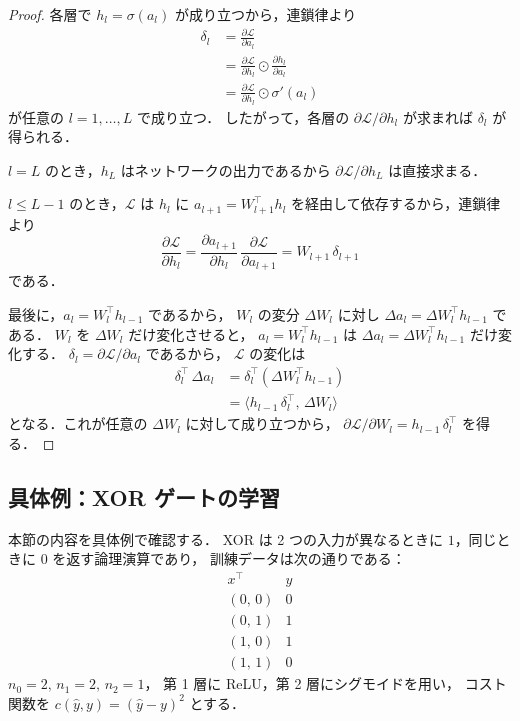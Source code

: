 \documentclass[uplatex, dvipdfmx]{jsarticle}
\begin{document}
\begin{proof}
各層で $h_l = \sigma(a_l)$ が成り立つから，連鎖律より
\begin{align*}
\delta_l
&= \frac{\partial\mathcal{L}}{\partial a_l} \\
&= \frac{\partial\mathcal{L}}{\partial h_l}\odot\frac{\partial h_l}{\partial a_l} \\
&= \frac{\partial\mathcal{L}}{\partial h_l}\odot\sigma'(a_l)
\end{align*}
が任意の $l=1,\ldots,L$ で成り立つ．
したがって，各層の $\partial\mathcal{L}/\partial h_l$ が求まれば $\delta_l$ が得られる．

$l=L$ のとき，$h_L$ はネットワークの出力であるから
$\partial\mathcal{L}/\partial h_L$ は直接求まる．

$l\le L{-}1$ のとき，$\mathcal{L}$ は $h_l$ に
$a_{l+1}=W_{l+1}^\top h_l$ を経由して依存するから，連鎖律より
\[
\frac{\partial\mathcal{L}}{\partial h_l}
= \frac{\partial a_{l+1}}{\partial h_l}\,\frac{\partial\mathcal{L}}{\partial a_{l+1}}
= W_{l+1}\,\delta_{l+1}
\]
である．

最後に，$a_l = W_l^\top h_{l-1}$ であるから，
$W_l$ の変分 $\Delta W_l$ に対し $\Delta a_l = \Delta W_l^\top h_{l-1}$ である．
$W_l$ を $\Delta W_l$ だけ変化させると，
$a_l = W_l^\top h_{l-1}$ は $\Delta a_l = \Delta W_l^\top h_{l-1}$ だけ変化する．
$\delta_l = \partial\mathcal{L}/\partial a_l$ であるから，
$\mathcal{L}$ の変化は
\begin{align*}
\delta_l^\top\,\Delta a_l
&= \delta_l^\top (\Delta W_l^\top h_{l-1}) \\
&= \langle h_{l-1}\,\delta_l^\top,\, \Delta W_l \rangle
\end{align*}
となる．これが任意の $\Delta W_l$ に対して成り立つから，
$\partial\mathcal{L}/\partial W_l = h_{l-1}\,\delta_l^\top$ を得る．
\end{proof}

\subsection{具体例：XOR ゲートの学習}

本節の内容を具体例で確認する．
XOR は 2 つの入力が異なるときに $1$，同じときに $0$ を返す論理演算であり，
訓練データは次の通りである：
\[
\begin{array}{c|c}
x^\top & y \\ \hline
(0,\,0) & 0 \\
(0,\,1) & 1 \\
(1,\,0) & 1 \\
(1,\,1) & 0
\end{array}
\]
$n_0=2,\, n_1=2,\, n_2=1$，
第 1 層に ReLU，第 2 層にシグモイドを用い，
コスト関数を $c(\hat{y},y)=(\hat{y}-y)^2$ とする．
\end{document}
